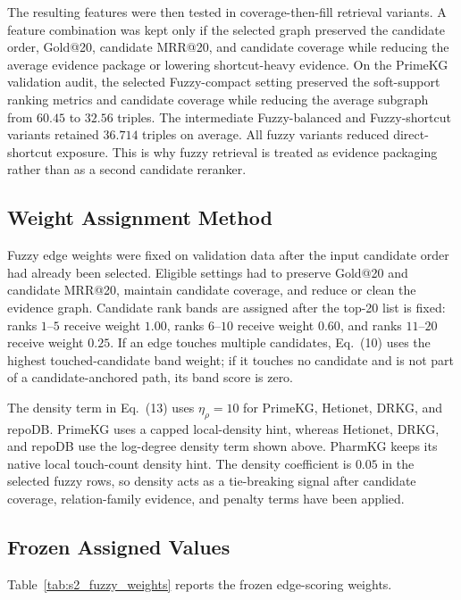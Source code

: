 \documentclass[11pt]{article}
\makeatletter
\newcommand{\mainequation}[1]{Eq.~(#1)}
\newcommand{\mrr}{MRR@20}
\newcommand{\gold}{Gold@20}
\makeatother
\begin{document}
    The resulting features were then tested in coverage-then-fill retrieval variants. A feature combination was kept only if the selected graph preserved the candidate order, \gold{}, candidate \mrr{}, and candidate coverage while reducing the average evidence package or lowering shortcut-heavy evidence. On the PrimeKG validation audit, the selected Fuzzy-compact setting preserved the soft-support ranking metrics and candidate coverage while reducing the average subgraph from \(60.45\) to \(32.56\) triples. The intermediate Fuzzy-balanced and Fuzzy-shortcut variants retained \(36.714\) triples on average. All fuzzy variants reduced direct-shortcut exposure. This is why fuzzy retrieval is treated as evidence packaging rather than as a second candidate reranker.

    \subsection{Weight Assignment Method}

    Fuzzy edge weights were fixed on validation data after the input candidate order had already been selected. Eligible settings had to preserve \gold{} and candidate \mrr{}, maintain candidate coverage, and reduce or clean the evidence graph. Candidate rank bands are assigned after the top-20 list is fixed: ranks \(1\)--\(5\) receive weight \(1.00\), ranks \(6\)--\(10\) receive weight \(0.60\), and ranks \(11\)--\(20\) receive weight \(0.25\). If an edge touches multiple candidates, \mainequation{10} uses the highest touched-candidate band weight; if it touches no candidate and is not part of a candidate-anchored path, its band score is zero.

    The density term in \mainequation{13} uses \(\eta_\rho=10\) for PrimeKG, Hetionet, DRKG, and repoDB. PrimeKG uses a capped local-density hint, whereas Hetionet, DRKG, and repoDB use the log-degree density term shown above. PharmKG keeps its native local touch-count density hint. The density coefficient is \(0.05\) in the selected fuzzy rows, so density acts as a tie-breaking signal after candidate coverage, relation-family evidence, and penalty terms have been applied.

    \subsection{Frozen Assigned Values}

    Table~\ref{tab:s2_fuzzy_weights} reports the frozen edge-scoring weights.
\end{document}
